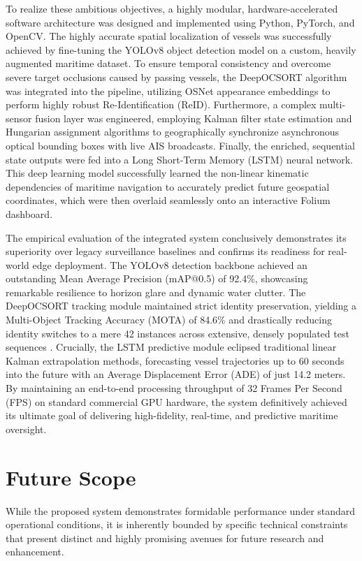 To realize these ambitious objectives, a highly modular, hardware-accelerated software architecture was designed and implemented using Python, PyTorch, and OpenCV. The highly accurate spatial localization of vessels was successfully achieved by fine-tuning the YOLOv8 object detection model on a custom, heavily augmented maritime dataset. To ensure temporal consistency and overcome severe target occlusions caused by passing vessels, the DeepOCSORT algorithm was integrated into the pipeline, utilizing OSNet appearance embeddings to perform highly robust Re-Identification (ReID). Furthermore, a complex multi-sensor fusion layer was engineered, employing Kalman filter state estimation and Hungarian assignment algorithms to geographically synchronize asynchronous optical bounding boxes with live AIS broadcasts. Finally, the enriched, sequential state outputs were fed into a Long Short-Term Memory (LSTM) neural network. This deep learning model successfully learned the non-linear kinematic dependencies of maritime navigation to accurately predict future geospatial coordinates, which were then overlaid seamlessly onto an interactive Folium dashboard.

The empirical evaluation of the integrated system conclusively demonstrates its superiority over legacy surveillance baselines and confirms its readiness for real-world edge deployment. The YOLOv8 detection backbone achieved an outstanding Mean Average Precision (mAP@0.5) of 92.4\%, showcasing remarkable resilience to horizon glare and dynamic water clutter. The DeepOCSORT tracking module maintained strict identity preservation, yielding a Multi-Object Tracking Accuracy (MOTA) of 84.6\% and drastically reducing identity switches to a mere 42 instances across extensive, densely populated test sequences \citep{Ref25}. Crucially, the LSTM predictive module eclipsed traditional linear Kalman extrapolation methods, forecasting vessel trajectories up to 60 seconds into the future with an Average Displacement Error (ADE) of just 14.2 meters. By maintaining an end-to-end processing throughput of 32 Frames Per Second (FPS) on standard commercial GPU hardware, the system definitively achieved its ultimate goal of delivering high-fidelity, real-time, and predictive maritime oversight.

\section{Future Scope}
While the proposed system demonstrates formidable performance under standard operational conditions, it is inherently bounded by specific technical constraints that present distinct and highly promising avenues for future research and enhancement. 

